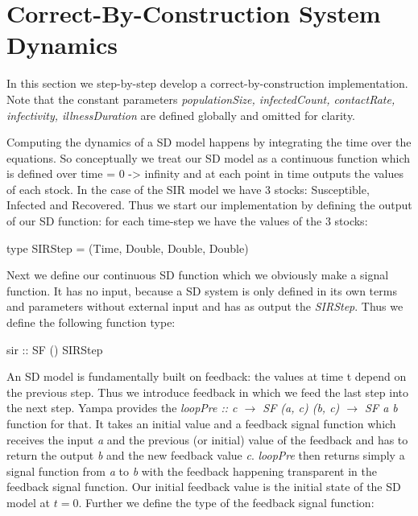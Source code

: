 \chapter{Correct-By-Construction System Dynamics}
\label{app:sdSimulation}

In this section we step-by-step develop a correct-by-construction implementation. Note that the constant parameters \textit{populationSize, infectedCount, contactRate, infectivity, illnessDuration} are defined globally and omitted for clarity.

Computing the dynamics of a SD model happens by integrating the time over the equations. So conceptually we treat our SD model as a continuous function which is defined over time = 0 -> infinity and at each point in time outputs the values of each stock. In the case of the SIR model we have 3 stocks: Susceptible, Infected and Recovered. Thus we start our implementation by defining the output of our SD function: for each time-step we have the values of the 3 stocks:

\begin{HaskellCode}
type SIRStep = (Time, Double, Double, Double)
\end{HaskellCode}

Next we define our continuous SD function which we obviously make a signal function. It has no input, because a SD system is only defined in its own terms and parameters without external input and has as output the \textit{SIRStep}. Thus we define the following function type:

\begin{HaskellCode}
sir :: SF () SIRStep
\end{HaskellCode}

An SD model is fundamentally built on feedback: the values at time t depend on the previous step. Thus we introduce feedback in which we feed the last step into the next step. Yampa provides the \textit{loopPre :: c $\to$ SF (a, c) (b, c) $\to$ SF a b} function for that. It takes an initial value and a feedback signal function which receives the input \textit{a} and the previous (or initial) value of the feedback and has to return the output \textit{b} and the new feedback value \textit{c}. \textit{loopPre} then returns simply a signal function from \textit{a} to \textit{b} with the feedback happening transparent in the feedback signal function. Our initial feedback value is the initial state of the SD model at $t = 0$. Further we define the type of the feedback signal function:

